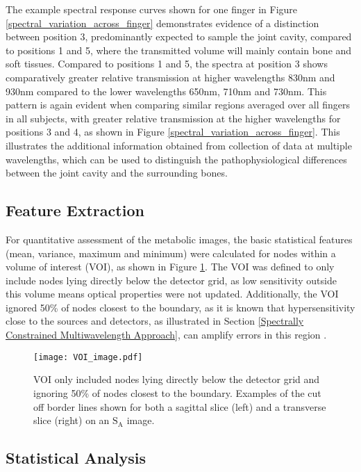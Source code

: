 \documentclass[twoside]{bhamthesis}
\theoremstyle{definition}
\begin{document}
The example spectral response curves shown for one finger in Figure \ref{spectral_variation_across_finger} demonstrates evidence of a distinction between position 3, predominantly expected to sample the joint cavity, compared to positions 1 and 5, where the transmitted volume will mainly contain bone and soft tissues. Compared to positions 1 and 5, the spectra at position 3 shows comparatively greater relative transmission at higher wavelengths 830nm and 930nm compared to the lower wavelengths 650nm, 710nm and 730nm. This pattern is again evident when comparing similar regions averaged over all fingers in all subjects, with greater relative transmission at the higher wavelengths for positions 3 and 4, as shown in Figure \ref{spectral_variation_across_finger}. This illustrates the additional information obtained from collection of data at multiple wavelengths, which can be used to distinguish the pathophysiological differences between the joint cavity and the surrounding bones.

\subsection{Feature Extraction} 
\label{Feature Extraction}
For quantitative assessment of the metabolic images, the basic statistical features (mean, variance, maximum and minimum) were calculated for nodes within a volume of interest (VOI), as shown in Figure \ref{VOI_image}. The VOI was defined to only include nodes lying directly below the detector grid, as low sensitivity outside this volume means optical properties were not updated. Additionally, the VOI ignored 50\% of nodes closest to the boundary, as it is known that hypersensitivity close to the sources and detectors, as illustrated in Section
\ref{Spectrally Constrained Multiwavelength Approach}, can amplify errors in this region \cite{boas2001simultaneous}. 

\begin{figure}[!ht]
\centering\texttt{[image: VOI\_image.pdf]}
\caption{VOI only included nodes lying directly below the detector grid and ignoring 50\% of nodes closest to the boundary. Examples of the cut off border lines shown for both a sagittal slice (left) and a transverse slice (right) on an $\mathrm{S_A}$ image.}
\label{VOI_image}
\end{figure}

\subsection{Statistical Analysis} 
\end{document}
